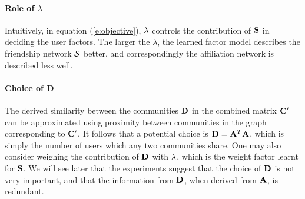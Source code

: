 \paragraph*{Role of $\lambda$}
Intuitively, in equation (\ref{e:objective}), $\lambda$ controls the contribution of $\mathbf{S}$ in deciding the user factors. The larger the $\lambda$, the learned factor model describes the friendship network $\mathcal{S}$ better, and correspondingly the affiliation network is described less well.

\paragraph*{Choice of D}
The derived similarity between the communities $\mathbf{D}$ in the combined matrix $\mathbf{C}'$ can be approximated using proximity between communities in the graph corresponding to $\mathbf{C}'$. It follows that a potential choice is $\mathbf{D} = \mathbf{A}^T \mathbf{A}$, which is simply the number of users which any two communities share. One may also consider weighing the contribution of $\mathbf{D}$ with $\lambda$, which is the weight factor learnt for $\mathbf{S}$. We will see later that the experiments suggest that the choice of $\mathbf{D}$ is not very important, and that the information from $\mathbf{D}$, when derived from $\mathbf{A}$, is redundant.

